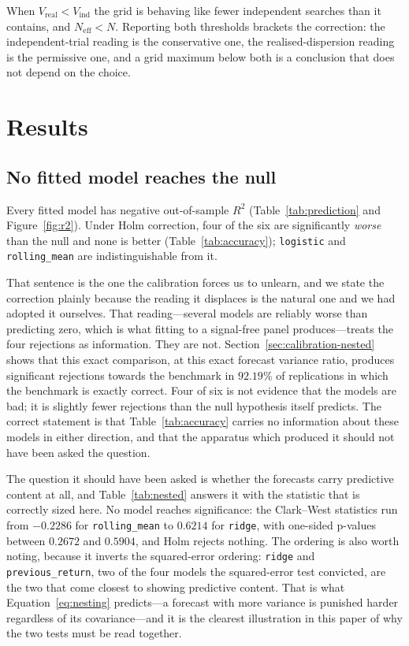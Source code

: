 \documentclass{article}
\theoremstyle{plain}
\theoremstyle{remark}
\begin{document}
When $V_{\mathrm{real}} < V_{\mathrm{ind}}$ the grid is behaving like fewer
independent searches than it contains, and $N_{\mathrm{eff}} < N$. Reporting both
thresholds brackets the correction: the independent-trial reading is the
conservative one, the realised-dispersion reading is the permissive one, and a
grid maximum below both is a conclusion that does not depend on the choice.

\section{Results}

\subsection{No fitted model reaches the null}




Every fitted model has negative out-of-sample $R^2$ (Table~\ref{tab:prediction}
and Figure~\ref{fig:r2}). Under Holm correction, four of the six are
significantly \emph{worse} than the null and none is better
(Table~\ref{tab:accuracy}); \texttt{logistic} and \texttt{rolling\_mean} are
indistinguishable from it.

That sentence is the one the calibration forces us to unlearn, and we state the
correction plainly because the reading it displaces is the natural one and we
had adopted it ourselves. That reading---several models are reliably worse than
predicting zero, which is what fitting to a signal-free panel produces---treats
the four rejections as information. They are not.
Section~\ref{sec:calibration-nested} shows that this exact comparison, at this
exact forecast variance ratio, produces significant rejections towards the
benchmark in $92.19\%$ of replications in which the benchmark is exactly
correct. Four of six is not evidence that the models are bad; it is slightly
fewer rejections than the null hypothesis itself predicts. The correct statement
is that Table~\ref{tab:accuracy} carries no information about these models in
either direction, and that the apparatus which produced it should not have been
asked the question.



The question it should have been asked is whether the forecasts carry predictive
content at all, and Table~\ref{tab:nested} answers it with the statistic that is
correctly sized here. No model reaches significance: the Clark--West statistics
run from $-0.2286$ for \texttt{rolling\_mean} to $0.6214$ for \texttt{ridge},
with one-sided p-values between $0.2672$ and $0.5904$, and Holm rejects nothing.
The ordering is also worth noting, because it inverts the squared-error
ordering: \texttt{ridge} and \texttt{previous\_return}, two of the four models
the squared-error test convicted, are the two that come closest to showing
predictive content. That is what Equation~\ref{eq:nesting} predicts---a forecast
with more variance is punished harder regardless of its covariance---and it is
the clearest illustration in this paper of why the two tests must be read
together.
\end{document}

